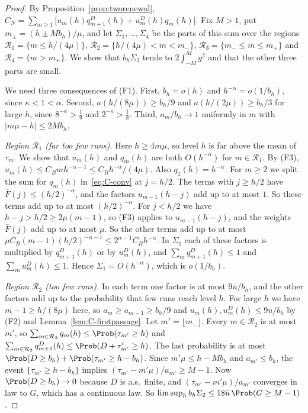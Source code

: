 \begin{proof}
By Proposition~\ref{prop:tworenewal},
$C_N=\sum_{m\ge1}\bigl[u_m(h)q^D_{m+1}(h)+u^D_m(h)q_m(h)\bigr]$. Fix $M>1$, put
$m_\pm=(h\pm Mb_h)/\mu$, and let $\Sigma_1,\dots,\Sigma_4$ be the parts of this sum over
the regions $\mathcal R_1=\{m\le h/(4\mu)\}$, $\mathcal R_2=\{h/(4\mu)<m<m_-\}$,
$\mathcal R_3=\{m_-\le m\le m_+\}$ and $\mathcal R_4=\{m>m_+\}$. We show that
$b_h\Sigma_3$ tends to $2\int_{-M}^Mg^2$ and that the other three parts are small.

We need three consequences of (F1). First, $b_h=o(h)$ and $h^{-\alpha}=o(1/b_h)$, since
$\kappa<1<\alpha$. Second, $a(h/(8\mu))\ge b_h/9$ and $a(h/(2\mu))\ge b_h/3$ for large
$h$, since $8^{-\kappa}>\frac19$ and $2^{-\kappa}>\frac13$. Third, $a_m/b_h\to1$
uniformly in $m$ with $\lvert m\mu-h\rvert\le2Mb_h$.

\emph{Region $\mathcal R_1$ (far too few runs).} Here $h\ge4m\mu$, so level $h$ is far above
the mean of $\tau_m$. We show that $u_m(h)$ and $q_m(h)$ are both $O(h^{-\alpha})$ for
$m\in\mathcal R_1$. By (F3), $u_m(h)\le C_Bmh^{-\alpha-1}\le C_Bh^{-\alpha}/(4\mu)$. Also
$q_1(h)=h^{-\alpha}$. For $m\ge2$ we split the sum for $q_m(h)$ in~\eqref{eq:C-conv} at
$j=h/2$. The terms with $j\ge h/2$ have $\bar F(j)\le(h/2)^{-\alpha}$, and the factors
$u_{m-1}(h-j)$ add up to at most $1$. So these terms add up to at most
$(h/2)^{-\alpha}$. For $j<h/2$ we have $h-j>h/2\ge2\mu(m-1)$, so (F3) applies to
$u_{m-1}(h-j)$, and the weights $\bar F(j)$ add up to at most $\mu$. So the other terms
add up to at most $\mu C_B(m-1)(h/2)^{-\alpha-1}\le2^{\alpha-1}C_Bh^{-\alpha}$. In
$\Sigma_1$ each of these factors is multiplied by $q^D_{m+1}(h)$ or by $u^D_m(h)$, and
$\sum_mq^D_{m+1}(h)\le1$ and $\sum_mu^D_m(h)\le1$. Hence $\Sigma_1=O(h^{-\alpha})$, which
is $o(1/b_h)$.

\emph{Region $\mathcal R_2$ (too few runs).} In each term one
factor is at most $9\bar u/b_h$, and the other factors add up to the probability that few
runs reach level $h$. For large $h$ we have $m-1\ge h/(8\mu)$ here, so
$a_m\ge a_{m-1}\ge b_h/9$ and $u_m(h),u^D_m(h)\le9\bar u/b_h$ by (F2) and
Lemma~\ref{lem:C-firstpassage}. Let $m'=\lfloor m_-\rfloor$. Every $m\in\mathcal R_2$ is
at most $m'$, so $\sum_{m\in\mathcal R_2}q_m(h)\le\Prob(\tau_{m'}\ge h)$ and
$\sum_{m\in\mathcal R_2}q^D_{m+1}(h)\le\Prob(D+\tau'_{m'}\ge h)$. The last probability
is at most $\Prob(D\ge b_h)+\Prob(\tau_{m'}\ge h-b_h)$. Since $m'\mu\le h-Mb_h$ and
$a_{m'}\le b_h$, the event $\{\tau_{m'}\ge h-b_h\}$ implies
$(\tau_{m'}-m'\mu)/a_{m'}\ge M-1$. Now $\Prob(D\ge b_h)\to0$ because $D$ is a.s.\
finite, and $(\tau_{m'}-m'\mu)/a_{m'}$ converges in law to $G$, which has a continuous
law. So $\limsup_hb_h\Sigma_2\le18\bar u\,\Prob(G\ge M-1)$.


\end{proof}
